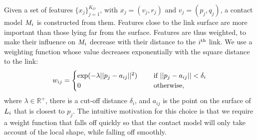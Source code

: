 Given a set of features $\lbrace x_j \rbrace_{j=1}^{K_O}$, with $x_j = (v_j, r_j)$ and $v_j = (p_j, q_j)$, a contact model $M_i$ is constructed from them.  Features close to the link surface are more important than those lying far from the surface. Features are thus weighted, to make their influence on $M_i$  decrease with their distance to the $i^\textnormal{th}$ link. %
We use a weighting function whose value decreases exponentially with the square distance to the link:
\begin{equation}
w_{ij} = \begin{cases}\exp(-\lambda ||p_j-a_{ij}||^2) \quad &\textnormal{ if } ||p_j-a_{ij}|| < \delta_i\\
0 \quad &\textnormal{ otherwise},\end{cases}
\label{eq:learning.modeldist.wgh}
\end{equation}
where $\lambda \in \mathbb R^{+}$, there is a cut-off distance $\delta_i$, and $a_{ij}$ is the point on the surface of $L_i$ that is closest to $p_j$. The intuitive motivation for this choice is that we require a weight function that falls off quickly so that the contact model will only take account of the local shape, while falling off smoothly.

